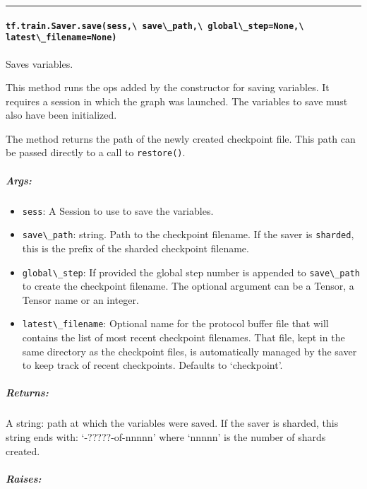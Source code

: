 \begin{center}\rule{0.5\linewidth}{\linethickness}\end{center}

\paragraph{\texorpdfstring{\lstinline{tf.train.Saver.save(sess,\ save\_path,\ global\_step=None,\ latest\_filename=None)}
}{tf.train.Saver.save(sess, save\_path, global\_step=None, latest\_filename=None) }}\label{tf.train.saver.savesess-saveux5fpath-globalux5fstepnone-latestux5ffilenamenone}

Saves variables.

This method runs the ops added by the constructor for saving variables.
It requires a session in which the graph was launched. The variables to
save must also have been initialized.

The method returns the path of the newly created checkpoint file. This
path can be passed directly to a call to \lstinline{restore()}.

\subparagraph{Args: }\label{args-10}

\begin{itemize}
\tightlist
\item
  \lstinline{sess}: A Session to use to save the variables.
\item
  \lstinline{save\_path}: string. Path to the checkpoint filename. If the
  saver is \lstinline{sharded}, this is the prefix of the sharded
  checkpoint filename.
\item
  \lstinline{global\_step}: If provided the global step number is appended
  to \lstinline{save\_path} to create the checkpoint filename. The optional
  argument can be a Tensor, a Tensor name or an integer.
\item
  \lstinline{latest\_filename}: Optional name for the protocol buffer file
  that will contains the list of most recent checkpoint filenames. That
  file, kept in the same directory as the checkpoint files, is
  automatically managed by the saver to keep track of recent
  checkpoints. Defaults to `checkpoint'.
\end{itemize}

\subparagraph{Returns: }\label{returns-14}

A string: path at which the variables were saved. If the saver is
sharded, this string ends with: `-?????-of-nnnnn' where `nnnnn' is the
number of shards created.

\subparagraph{Raises: }\label{raises-3}

